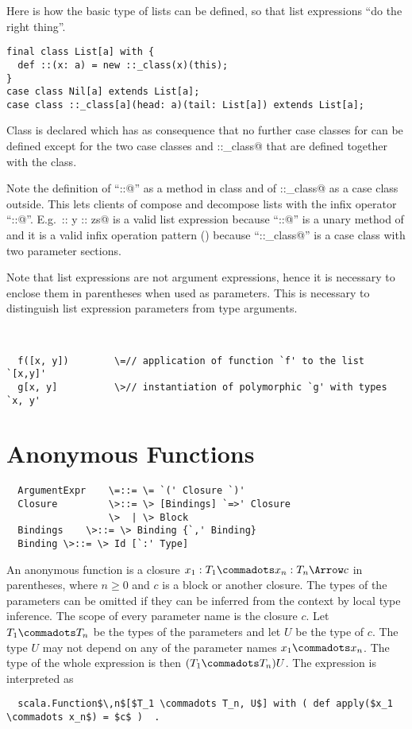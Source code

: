 \documentclass[11pt]{report}
\begin{document}
\begin{itemize}
\example Here is how the basic type of lists can be defined, so that
list expressions ``do the right thing''.
\begin{verbatim}
final class List[a] with {
  def ::(x: a) = new ::_class(x)(this);
}
case class Nil[a] extends List[a];
case class ::_class[a](head: a)(tail: List[a]) extends List[a];
\end{verbatim}
Class \verb@List@ is declared \verb@final@ which has as
consequence that no further case classes for \verb@List@ can be
defined except for the two case classes \verb@Nil@ and \verb@::_class@ that are
defined together with the class.

Note the definition of ``\verb@::@'' as a method in class \verb@List@
and of \verb@::_class@ as a case class outside.  This lets clients of
\verb@List@ compose and decompose lists with the infix operator
``\verb@::@''. E.g.\ \verb@x :: y :: zs@ is a valid list expression
because ``\verb@::@'' is a unary method of \verb@List@ and it is a
valid infix operation pattern () because
``\verb@::_class@'' is a case class with two parameter sections.

Note that list expressions are not argument expressions, hence it is
necessary to enclose them in parentheses when used as parameters.
This is necessary to distinguish list expression parameters from type arguments.

\example\

\begin{verbatim}
  f([x, y])	       \=// application of function `f' to the list `[x,y]'
  g[x, y]	       \>// instantiation of polymorphic `g' with types `x, y'
\end{verbatim}


\section{Anonymous Functions}
\label{sec:closures}

\syntax\begin{verbatim}
  ArgumentExpr    \=::= \= `(' Closure `)'
  Closure         \>::= \> [Bindings] `=>' Closure
                  \>  | \> Block
  Bindings	  \>::= \> Binding {`,' Binding}
  Binding \>::= \> Id [`:' Type]
\end{verbatim}

An anonymous function is a closure $x_1: T_1 \commadots x_n: T_n
\Arrow c$ in parentheses, where $n \geq 0$ and $c$ is a block or another closure.
The types of the parameters can be omitted if they can be inferred
from the context by local type inference.  The scope of every
parameter name is the closure $c$. Let $T_1
\commadots T_n$ be the types of the parameters and let $U$ be the type
of $c$. The type $U$ may not depend on any of the parameter
names $x_1 \commadots x_n$. The type of the whole expression is then
$(T_1 \commadots T_n) U$. The expression is interpreted as
\begin{verbatim}
  scala.Function$\,n$[$T_1 \commadots T_n, U$] with ( def apply($x_1 \commadots x_n$) = $c$ )  .
\end{verbatim}


\end{itemize}
\end{document}
